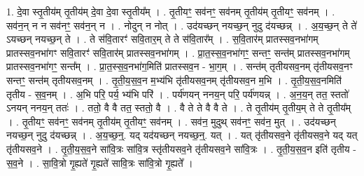 \documentclass[17pt]{extarticle}
\begin{document}
1. दे॒वा स्तृ॒तीय॑म् तृ॒तीय॑म् दे॒वा दे॒वा स्तृ॒तीय᳚म् । . तृ॒तीयꣳ॒॒ सव॑नꣳ॒॒ सव॑नम् तृ॒तीय॑म् तृ॒तीयꣳ॒॒ सव॑नम् । . सव॑न॒न् न न सव॑नꣳ॒॒ सव॑न॒न् न । . नोदुन् न नोत् । . उद॑यच्छन् नयच्छ॒न् नुदु द॑यच्छन्न् । . अ॒य॒च्छ॒न् ते ते॑ ऽयच्छन् नयच्छ॒न् ते । . ते स॑वि॒तारꣳ॑ सवि॒तार॒म् ते ते स॑वि॒तार᳚म् । . स॒वि॒तार॑म् प्रातस्सव॒नभा॑गम् प्रातस्सव॒नभा॑गꣳ सवि॒तारꣳ॑ सवि॒तार॑म् प्रातस्सव॒नभा॑गम् । . प्रा॒त॒स्स॒व॒नभा॑गꣳ॒॒ सन्तꣳ॒॒ सन्त॑म् प्रातस्सव॒नभा॑गम् प्रातस्सव॒नभा॑गꣳ॒॒ सन्त᳚म् । . प्रा॒त॒स्स॒व॒नभा॑ग॒मिति॑ प्रातस्सव॒न - भा॒ग॒म् । . सन्त॑म् तृतीयसव॒नम् तृ॑तीयसव॒नꣳ सन्तꣳ॒॒ सन्त॑म् तृतीयसव॒नम् । . तृ॒ती॒य॒स॒व॒न म॒भ्य॑भि तृ॑तीयसव॒नम् तृ॑तीयसव॒न म॒भि । . तृ॒ती॒य॒स॒व॒नमिति॑ तृतीय - स॒व॒नम् । . अ॒भि परि॒ पर्य॒ भ्य॑भि परि॑ । . पर्य॑णयन् ननय॒न् परि॒ पर्य॑णयन्न् । . अ॒न॒य॒न् तत॒ स्ततो॑ ऽनयन् ननय॒न् ततः॑ । . ततो॒ वै वै तत॒ स्ततो॒ वै । . वै ते ते वै वै ते । . ते तृ॒तीय॑म् तृ॒तीय॒म् ते ते तृ॒तीय᳚म् । . तृ॒तीयꣳ॒॒ सव॑नꣳ॒॒ सव॑नम् तृ॒तीय॑म् तृ॒तीयꣳ॒॒ सव॑नम् । . सव॑न॒ मुदुथ् सव॑नꣳ॒॒ सव॑न॒ मुत् । . उद॑यच्छन् नयच्छ॒न् नुदु द॑यच्छन्न् । . अ॒य॒च्छ॒न्॒. यद् यद॑यच्छन् नयच्छ॒न्॒. यत् । . यत् तृ॑तीयसव॒ने तृ॑तीयसव॒ने यद् यत् तृ॑तीयसव॒ने । . तृ॒ती॒य॒स॒व॒ने सा॑वि॒त्रः सा॑वि॒त्र स्तृ॑तीयसव॒ने तृ॑तीयसव॒ने सा॑वि॒त्रः । . तृ॒ती॒य॒स॒व॒न इति॑ तृतीय - स॒व॒ने । . सा॒वि॒त्रो गृ॒ह्यते॑ गृ॒ह्यते॑ सावि॒त्रः सा॑वि॒त्रो गृ॒ह्यते᳚ । \newline
\end{document}
